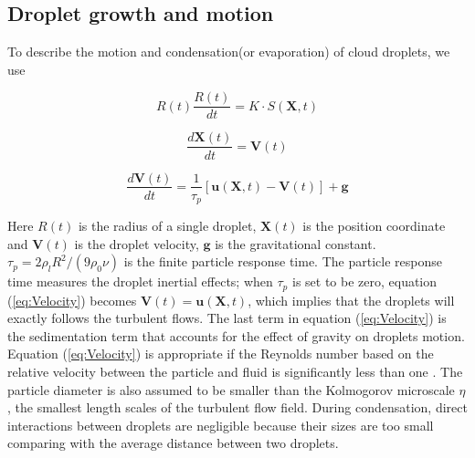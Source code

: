 \documentclass[draft,jgrga]{AGUTeX}
\begin{document}
\begin{article}
\subsection{Droplet growth and motion}

To describe the motion and condensation(or evaporation) of cloud droplets, we use

\begin{equation}
R(t)\frac{R(t)}{dt}=K\cdot S(\mathbf{X},t)\label{eq:Radius}
\end{equation}


\begin{equation}
\frac{d\mathbf{X}(t)}{dt}=\mathbf{V}(t)\label{eq:Coords}
\end{equation}


\begin{equation}
\frac{d\mathbf{V}(t)}{dt}=\frac{1}{\tau_{p}}[\mathbf{u}(\mathbf{X},t)-\mathbf{V}(t)]+\mathbf{g}\label{eq:Velocity}
\end{equation}


Here $R(t)$ is the radius of a single droplet, $\mathbf{X}(t)$ is the position
coordinate and $\mathbf{V}(t)$ is the droplet velocity, $\mathbf{g}$ is the gravitational constant. $\tau_{p}=2\rho_{l}R^{2}/(9\rho_{0}\nu)$ is the finite
particle response time. The particle response time measures the droplet
inertial effects; when $\tau_{p}$ is set to be zero, equation (\ref{eq:Velocity}) becomes $\mathbf{V}(t)=\mathbf{u}(\mathbf{X},t)$, which implies that the droplets will exactly follows the turbulent flows. The last term in equation (\ref{eq:Velocity}) is the sedimentation term that accounts for the effect of gravity on droplets motion. Equation (\ref{eq:Velocity}) is appropriate if the Reynolds number based on the relative velocity between the particle and fluid is significantly less than one \cite{Eaton94}. The particle
diameter is also assumed to be smaller than the Kolmogorov microscale
$\eta$, the smallest length scales of the turbulent flow field. During
condensation, direct interactions between droplets are negligible because
their sizes are too small comparing with the average distance between
two droplets.


\end{article}
\end{document}
